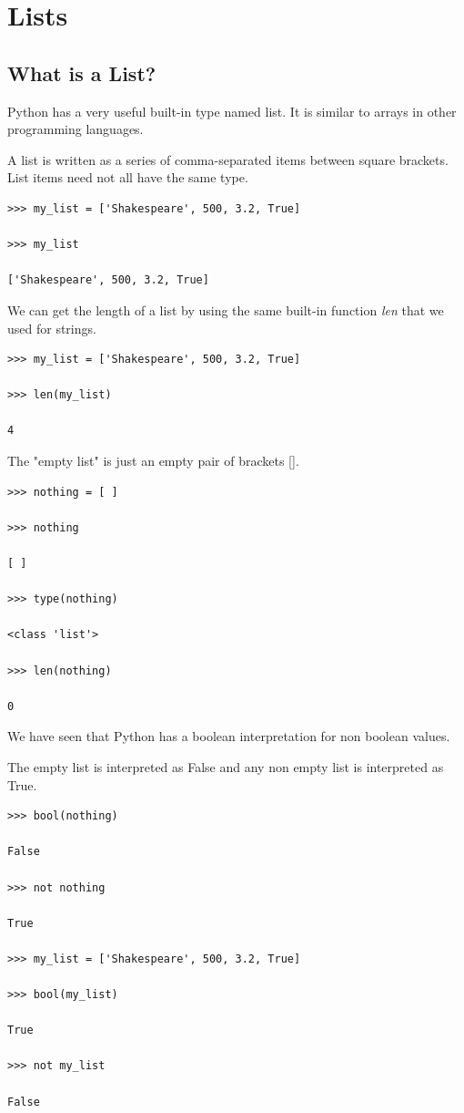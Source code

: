 \documentclass{article}
\begin{document}
\section{Lists}

\subsection{What is a List?}

Python has a very useful built-in type named list.  It is similar to arrays in other programming languages.

A list is written as a series of comma-separated items between square brackets.  List items need not all have the same type.

\begin{lstlisting}
>>> my_list = ['Shakespeare', 500, 3.2, True]

>>> my_list

['Shakespeare', 500, 3.2, True]

\end{lstlisting}

We can get the length of a list by using the same built-in function \textit{len} that we used for strings.

\begin{lstlisting}
>>> my_list = ['Shakespeare', 500, 3.2, True]

>>> len(my_list)

4

\end{lstlisting}

The "empty list" is just an empty pair of brackets [].

\begin{lstlisting}
>>> nothing = [ ]

>>> nothing

[ ]

>>> type(nothing)

<class 'list'>

>>> len(nothing)

0

\end{lstlisting}

We have seen that Python has a boolean interpretation  for non boolean values.  

The empty list is interpreted as False and any non empty list is interpreted as True.

\begin{lstlisting}
>>> bool(nothing)

False

>>> not nothing

True

>>> my_list = ['Shakespeare', 500, 3.2, True]

>>> bool(my_list)

True

>>> not my_list

False

\end{lstlisting}
\end{document}
